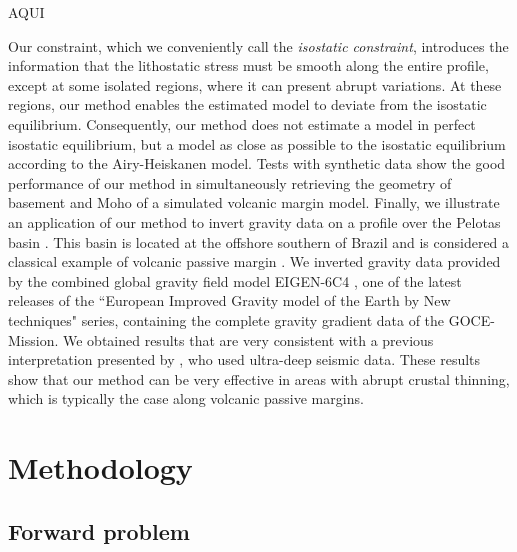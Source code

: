 \documentclass[manuscript]{geophysics}
\begin{document}
AQUI

Our constraint, which we conveniently call the \textit{isostatic constraint},
introduces the information that the lithostatic stress must be smooth along the 
entire profile, except at some isolated regions, where it can present abrupt variations.
At these regions, our method enables the estimated model to deviate from the 
isostatic equilibrium.
Consequently, our method does not estimate a model in perfect isostatic equilibrium, 
but a model as close as possible to the isostatic equilibrium according to the
Airy-Heiskanen model. 
Tests with synthetic data show the good performance of our method in simultaneously
retrieving the geometry of basement and Moho of a simulated volcanic margin
model. Finally, we illustrate an application of our method to invert 
gravity data on a profile over the Pelotas basin \citep{stica-etal2014}. This basin is
located at the offshore southern of Brazil and is considered a classical example 
of volcanic passive margin \citep{geoffroy2005}. 
We inverted gravity data provided by the combined global gravity field model EIGEN-6C4
\citep{forste2014}, one of the latest releases of the ``European Improved Gravity model of 
the Earth by New techniques" series, containing the complete gravity gradient data of the 
GOCE-Mission.
We obtained results that are very consistent with a previous
interpretation presented by \citet{zalan2015}, who used ultra-deep seismic data.
These results show that our method can be very effective in areas with abrupt crustal 
thinning, which is typically the case along volcanic passive margins.


\section{Methodology}


\subsection{Forward problem}
\end{document}
